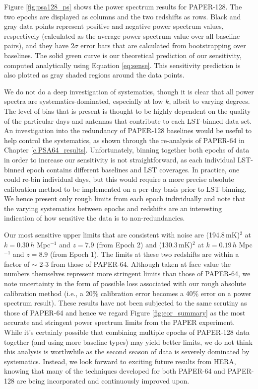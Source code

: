 Figure \ref{fig:psa128_ps} shows the power spectrum results for PAPER-128. The two epochs are displayed as columns and the two redshifts as rows. Black and gray data points represent positive and negative power spectrum values, respectively (calculated as the average power spectrum value over all baseline pairs), and they have $2\sigma$ error bars that are calculated from bootstrapping over baselines. The solid green curve is our theoretical prediction of our sensitivity, computed analytically using Equation \eqref{eq:sense}. This sensitivity prediction is also plotted as gray shaded regions around the data points.

We do not do a deep investigation of systematics, though it is clear that all power spectra are systematics-dominated, especially at low $k$, albeit to varying degrees. The level of bias that is present is thought to be highly dependent on the quality of the particular days and antennas that contribute to each LST-binned data set. An investigation into the redundancy of PAPER-128 baselines would be useful to help control the systematics, as shown through the re-analysis of PAPER-64 in Chapter \ref{c.PSA64_results}. Unfortunately, binning together both epochs of data in order to increase our sensitivity is not straightforward, as each individual LST-binned epoch contains different baselines and LST coverages. In practice, one could re-bin individual days, but this would require a more precise absolute calibration method to be implemented on a per-day basis prior to LST-binning. We hence present only rough limits from each epoch individually and note that the varying systematics between epochs and redshifts are an interesting indication of how sensitive the data is to non-redundancies.

Our most sensitive upper limits that are consistent with noise are (194.8\,mK)$^{2}$ at $k = 0.30\,h$ Mpc$^{-1}$ and $z=7.9$ (from Epoch 2) and (130.3\,mK)$^{2}$ at $k = 0.19\,h$ Mpc$^{-1}$ and $z=8.9$ (from Epoch 1). The limits at these two redshifts are within a factor of $\sim$ 2-3 from those of PAPER-64. Although taken at face value the numbers themselves represent more stringent limits than those of PAPER-64, we note uncertainty in the form of possible loss associated with our rough absolute calibration method (i.e., a 20\% calibration error becomes a 40\% error on a power spectrum result). These results have not been subjected to the same scrutiny as those of PAPER-64 and hence we regard Figure \ref{fig:eor_summary} as the most accurate and stringent power spectrum limits from the PAPER experiment. While it's certainly possible that combining multiple epochs of PAPER-128 data together (and using more baseline types) may yield better limits, we do not think this analysis is worthwhile as the second season of data is severely dominated by systematics. Instead, we look forward to exciting future results from HERA, knowing that many of the techniques developed for both PAPER-64 and PAPER-128 are being incorporated and continuously improved upon.

